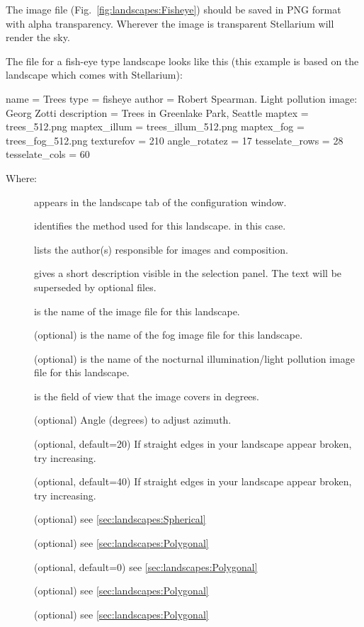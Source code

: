 The image file (Fig.~\ref{fig:landscapes:Fisheye}) should be saved in
PNG format with alpha transparency. Wherever the image is transparent
Stellarium will render the sky.

The  file for a fish-eye type landscape looks like
this (this example is based on the  landscape which
comes with Stellarium):

\begin{configfile}
[landscape]
name = Trees
type = fisheye
author = Robert Spearman. Light pollution image: Georg Zotti
description = Trees in Greenlake Park, Seattle
maptex = trees_512.png
maptex_illum = trees_illum_512.png
maptex_fog = trees_fog_512.png
texturefov = 210
angle_rotatez = 17
tesselate_rows = 28
tesselate_cols = 60
\end{configfile}
Where:
\begin{description}
\item[] appears in the landscape tab of the configuration window.
\item[] identifies the method used for this landscape.  in this case.
\item[] lists the author(s) responsible for images and composition.
\item[] gives a short description visible in the
  selection panel. The text will be superseded by optional
   files.
\item[] is the name of the image file for this landscape.
\item[] (optional) is the name of the fog image file for this landscape.
\item[] (optional) is the name of the nocturnal
  illumination/light pollution image file for this landscape.
\item[] is the field of view that the image covers in degrees.
\item[] (optional) Angle (degrees) to adjust azimuth.
\item[] (optional, default=20) If straight edges
  in your landscape appear broken, try increasing.
\item[] (optional, default=40) If straight edges
  in your landscape appear broken, try increasing.
\item[] (optional) see \ref{sec:landscapes:Spherical}
\item[] (optional) see \ref{sec:landscapes:Polygonal}
\item[] (optional, default=0) see \ref{sec:landscapes:Polygonal}
\item[] (optional)  see \ref{sec:landscapes:Polygonal}
\item[] (optional) see \ref{sec:landscapes:Polygonal}
\end{description}


